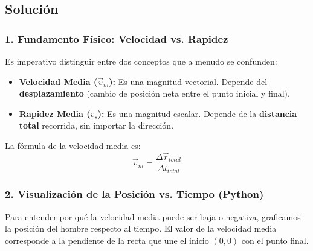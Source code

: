 \documentclass[12pt, a4paper]{article}
\begin{document}
\begin{center}
\end{center}

\subsection*{Solución}

\subsubsection*{1. Fundamento Físico: Velocidad vs. Rapidez}

Es imperativo distinguir entre dos conceptos que a menudo se confunden:
\begin{itemize}
    \item \textbf{Velocidad Media ($\vec{v}_m$):} Es una magnitud vectorial. Depende del \textbf{desplazamiento} (cambio de posición neta entre el punto inicial y final).
    \item \textbf{Rapidez Media ($v_s$):} Es una magnitud escalar. Depende de la \textbf{distancia total} recorrida, sin importar la dirección.
\end{itemize}

La fórmula de la velocidad media es:
\begin{equation}
    \vec{v}_m = \frac{\Delta \vec{r}_{total}}{\Delta t_{total}}
\end{equation}

\subsubsection*{2. Visualización de la Posición vs. Tiempo (Python)}

Para entender por qué la velocidad media puede ser baja o negativa, graficamos la posición del hombre respecto al tiempo. El valor de la velocidad media corresponde a la pendiente de la recta que une el inicio $(0,0)$ con el punto final.
\end{document}
